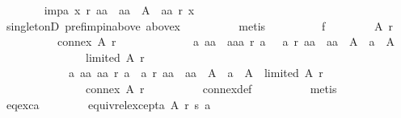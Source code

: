 \begin{isabellebody}
\ \ \ \ \ \ \isamarkupfalse%
\ imp{\isacharunderscore}{\kern0pt}a{\isacharcolon}{\kern0pt}\ {\isachardoublequoteopen}x\ {\isasympreceq}\isactrlsub r\ aa\ {\isasymlongrightarrow}\ aa\ {\isasymnotin}\ A\ {\isasymor}\ aa\ {\isasympreceq}\isactrlsub r\ x{\isachardoublequoteclose}\isanewline
\ \ \ \ \ \ \ \ \isamarkupfalse%
\ singletonD\ pref{\isacharunderscore}{\kern0pt}imp{\isacharunderscore}{\kern0pt}in{\isacharunderscore}{\kern0pt}above\ above{\isacharunderscore}{\kern0pt}x\isanewline
\ \ \ \ \ \ \ \ \isamarkupfalse%
\ metis\isanewline
\ \ \ \ \ \ \isamarkupfalse%
\ \isamarkupfalse%
\ f{}{\isacharcolon}{\kern0pt}\isanewline
\ \ \ \ \ \ \ \ {\isachardoublequoteopen}{\isasymforall}A\ r{\isachardot}{\kern0pt}\isanewline
\ \ \ \ \ \ \ \ \ \ {\isacharparenleft}{\kern0pt}connex\ A\ r\ {\isasymor}\isanewline
\ \ \ \ \ \ \ \ \ \ \ \ {\isacharparenleft}{\kern0pt}{\isasymexists}a{\isachardot}{\kern0pt}\ {\isacharparenleft}{\kern0pt}{\isasymexists}aa{\isachardot}{\kern0pt}\ {\isasymnot}\ {\isacharparenleft}{\kern0pt}aa{\isacharcolon}{\kern0pt}{\isacharcolon}{\kern0pt}{\isacharprime}{\kern0pt}a{\isacharparenright}{\kern0pt}\ {\isasympreceq}\isactrlsub r\ a\ {\isasymand}\ {\isasymnot}\ a\ {\isasympreceq}\isactrlsub r\ aa\ {\isasymand}\ aa\ {\isasymin}\ A{\isacharparenright}{\kern0pt}\ {\isasymand}\ a\ {\isasymin}\ A{\isacharparenright}{\kern0pt}\ {\isasymor}\isanewline
\ \ \ \ \ \ \ \ \ \ \ \ \ \ {\isasymnot}\ limited\ A\ r{\isacharparenright}{\kern0pt}\ {\isasymand}\isanewline
\ \ \ \ \ \ \ \ \ \ \ \ {\isacharparenleft}{\kern0pt}{\isacharparenleft}{\kern0pt}{\isasymforall}a{\isachardot}{\kern0pt}\ {\isacharparenleft}{\kern0pt}{\isasymforall}aa{\isachardot}{\kern0pt}\ aa\ {\isasympreceq}\isactrlsub r\ a\ {\isasymor}\ a\ {\isasympreceq}\isactrlsub r\ aa\ {\isasymor}\ aa\ {\isasymnotin}\ A{\isacharparenright}{\kern0pt}\ {\isasymor}\ a\ {\isasymnotin}\ A{\isacharparenright}{\kern0pt}\ {\isasymand}\ limited\ A\ r\ {\isasymor}\isanewline
\ \ \ \ \ \ \ \ \ \ \ \ \ \ {\isasymnot}\ connex\ A\ r{\isacharparenright}{\kern0pt}{\isachardoublequoteclose}\isanewline
\ \ \ \ \ \ \ \ \isamarkupfalse%
\ connex{\isacharunderscore}{\kern0pt}def\isanewline
\ \ \ \ \ \ \ \ \isamarkupfalse%
\ metis\isanewline
\ \ \ \ \ \ \isamarkupfalse%
\ \isamarkupfalse%
\ eq{\isacharunderscore}{\kern0pt}exc{\isacharunderscore}{\kern0pt}a{\isacharcolon}{\kern0pt}\isanewline
\ \ \ \ \ \ \ \ {\isachardoublequoteopen}equiv{\isacharunderscore}{\kern0pt}rel{\isacharunderscore}{\kern0pt}except{\isacharunderscore}{\kern0pt}a\ A\ r\ s\ a{\isachardoublequoteclose}\isanewline

\end{isabellebody}
